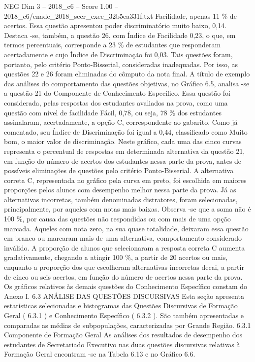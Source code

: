 \begin{textsample}{NEG Dim 3 – 2018\_c6 – Score 1.00 – 2018\_c6/enade\_2018\_secr\_exec\_32b5ea331f.txt}
Facilidade, apenas 11 \% de acertos.
Essa questão apresentou poder discriminatório muito baixo, 0,14.
Destaca -se, também, a questão 26, com Índice de Facilidade 0,23, o que, em termos percentuais, corresponde a 23 \% de estudantes que responderam acertadamente e cujo Índice de Discriminação foi 0,03.
Tais questões foram, portanto, pelo critério Ponto-Bisserial, consideradas inadequadas.
Por isso, as questões 22 e 26 foram eliminadas do cômputo da nota final.
A título de exemplo das análises do comportamento das questões objetivas, no Gráfico 6.5, analisa -se a questão 21 do Componente de Conhecimento Específico.
Essa questão foi considerada, pelas respostas dos estudantes avaliados na prova, como uma questão com nível de facilidade Fácil, 0,78, ou seja, 78 \% dos estudantes assinalaram, acertadamente, a opção C, correspondente ao gabarito.
Como já comentado, seu Índice de Discriminação foi igual a 0,44, classificado como Muito bom, o maior valor de discriminação.
Neste gráfico, cada uma das cinco curvas representa o percentual de respostas em determinada alternativa da questão 21, em função do número de acertos dos estudantes nessa parte da prova, antes de possíveis eliminações de questões pelo critério Ponto-Bisserial.
A alternativa correta C, representada no gráfico pela curva em preto, foi escolhida em maiores proporções pelos alunos com desempenho melhor nessa parte da prova.
Já as alternativas incorretas, também denominadas distratores, foram selecionadas, principalmente, por aqueles com notas mais baixas.
Observa -se que a soma não é 100 \%, por causa das questões não respondidas ou com mais de uma opção marcada.
Aqueles com nota zero, na sua quase totalidade, deixaram essa questão em branco ou marcaram mais de uma alternativa, comportamento considerado inválido.
A proporção de alunos que selecionaram a resposta correta C aumenta gradativamente, chegando a atingir 100 \%, a partir de 20 acertos ou mais, enquanto a proporção dos que escolheram alternativas incorretas decai, a partir de cinco ou seis acertos, em função do número de acertos nessa parte da prova.
Os gráficos relativos às demais questões do Conhecimento Específico constam do Anexo I. 6.3 ANÁLISE DAS QUESTÕES DISCURSIVAS Esta seção apresenta estatísticas selecionadas e histogramas das Questões Discursivas de Formação Geral ( 6.3.1 ) e Conhecimento Específico ( 6.3.2 ).
São também apresentadas e comparadas as médias de subpopulações, caracterizadas por Grande Região. 6.3.1 Componente de Formação Geral As análises dos resultados de desempenho dos estudantes de Secretariado Executivo nas duas questões discursivas relativas à Formação Geral encontram -se na Tabela 6.13 e no Gráfico 6.6.

\end{textsample}
